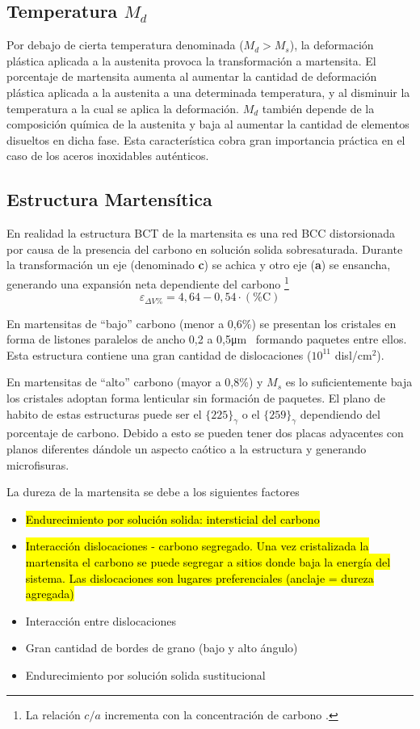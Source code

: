 \documentclass{article}
\newcommand{\um}{\si{\micro \meter}}
\begin{document}
\subsection[Temperatura {\it Md}]{Temperatura $M_d$}
Por debajo de cierta temperatura denominada ($M_d> M_s$), la
deformación plástica aplicada a la austenita provoca la transformación a martensita. El porcentaje de martensita aumenta al aumentar la cantidad de deformación plástica aplicada a la austenita a una determinada temperatura, y al disminuir la temperatura a la cual se aplica la deformación. $M_d$ también depende de la composición química de la austenita y baja al aumentar la cantidad de elementos disueltos en dicha fase. Esta característica cobra gran importancia práctica en el caso de los aceros inoxidables auténticos. 

\subsection{Estructura Martensítica}
En realidad la estructura BCT de la martensita es una red BCC distorsionada por causa de la presencia del carbono en solución solida sobresaturada. Durante la transformación un eje (denominado \textbf{c}) se achica y otro eje (\textbf{a}) se ensancha, generando una expansión neta dependiente del carbono \footnote{La relación $c/a$ incrementa con la concentración de carbono \cite{gottstein2013physical}.}
\[
\varepsilon_{\Delta V \%} = 4,64-0,54\cdot (\% \mathrm{C})
\]



En martensitas de ``bajo'' carbono (menor a 0,6\%) se presentan los cristales en forma de listones paralelos de ancho 0,2 a 0,5\um~  formando paquetes entre ellos. Esta estructura contiene una gran cantidad de dislocaciones ($10^{11}$ disl/cm$^2$).

En martensitas de ``alto'' carbono (mayor a 0,8\%) y $M_s$ es lo suficientemente baja los cristales adoptan forma lenticular sin formación de paquetes. El plano de habito de estas estructuras puede ser el $\{225 \}_\gamma$ o el $\{259 \}_\gamma$ dependiendo del porcentaje de carbono. Debido a esto se pueden tener dos placas adyacentes con planos diferentes dándole un aspecto caótico a la estructura y generando microfisuras.

La dureza de la martensita se debe a los siguientes factores
\begin{itemize}
    \item \hl{Endurecimiento por solución solida: intersticial del carbono}
    \item \hl{Interacción dislocaciones - carbono segregado. Una vez cristalizada la martensita el carbono se puede segregar a sitios donde baja la energía del sistema. Las dislocaciones son lugares preferenciales (anclaje = dureza agregada)}
    \item Interacción entre dislocaciones
    \item Gran cantidad de bordes de grano (bajo y alto ángulo)
    \item Endurecimiento por solución solida sustitucional
\end{itemize}
\end{document}
